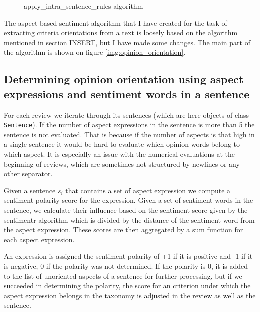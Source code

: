 \begin{figure}[h]
\begin{algorithm}[H]



\end{algorithm}
\caption{apply\_intra\_sentence\_rules algorithm}
\label{img:intra_sentence}
\end{figure}



The aspect-based sentiment algorithm that I have created for the task of extracting criteria orientations from a text is loosely based on the algorithm mentioned in section INSERT, but I have made some changes. The main part of the algorithm is shown on figure \ref{img:opinion_orientation}. 

\subsection{Determining opinion orientation using aspect expressions and sentiment words in a sentence}

For each review we iterate through its sentences (which are here objects of class \texttt{Sentence}). If the number of aspect expressions in the sentence is more than 5 the sentence is not evaluated. That is because if the number of aspects is that high in a single sentence it would be hard to evaluate which opinion words belong to which aspect. It is especially an issue with the numerical evaluations at the beginning of reviews, which are sometimes not structured by newlines or any other separator.

Given a sentence $s_{i}$ that contains a set of aspect expression we compute a sentiment polarity score for the expression. Given a set of sentiment words in the sentence, we calculate their influence based on the sentiment score given by the sentimentr algorithm which is divided by the distance of the sentiment word from the aspect expression. These scores are then aggregated by a sum function for each aspect expression.

An expression is assigned the sentiment polarity of +1 if it is positive and -1 if it is negative, 0 if the polarity was not determined. If the polarity is 0, it is added to the list of unoriented aspects of a sentence for further processing, but if we succeeded in determining the polarity, the score for an criterion under which the aspect expression belongs in the taxonomy is adjusted in the review as well as the sentence.
